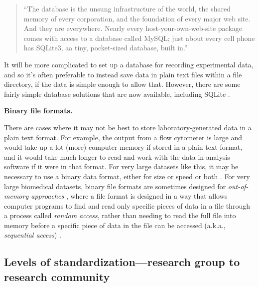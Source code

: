 \documentclass[]{tufte-book}
\begin{document}
\begin{quote}
``The database is the unsung infrastructure of the world, the shared memory of
every corporation, and the foundation of every major web site. And they are
everywhere. Nearly every host-your-own-web-site package comes with access to a
database called MySQL; just about every cell phone has SQLite3, aa tiny,
pocket-sized database, built in.'' \citep{ford2015i}
\end{quote}

It will be more complicated to set up a database for recording experimental
data, and so it's often preferable to instead save data in plain text files
within a file directory, if the data is simple enough to allow that. However,
there are some fairly simple database solutions that are now available,
including SQLite \citep{buffalo2015bioinformatics}.

\textbf{Binary file formats.}

There are cases where it may not be best to store laboratory-generated data in a
plain text format. For example, the output from a flow cytometer is large and
would take up a lot (more) computer memory if stored in a plain text format, and
it would take much longer to read and work with the data in analysis software if
it were in that format. For very large datasets like this, it may be necessary
to use a binary data format, either for size or speed or both
\citep{kernighan1984unix, hunt2000pragmatic}. For very large biomedical datasets,
binary file formats are sometimes designed for \emph{out-of-memory approaches}
\citep{buffalo2015bioinformatics}, where a file format is designed in a way that
allows computer programs to find and read only specific pieces of data in a file
through a process called \emph{random access}, rather than needing to read the full
file into memory before a specific piece of data in the file can be accessed
(a.k.a., \emph{sequential access}) \citep{murrell2009introduction}.

\hypertarget{levels-of-standardizationresearch-group-to-research-community}{%
\subsection{Levels of standardization---research group to research community}\label{levels-of-standardizationresearch-group-to-research-community}}
\end{document}
